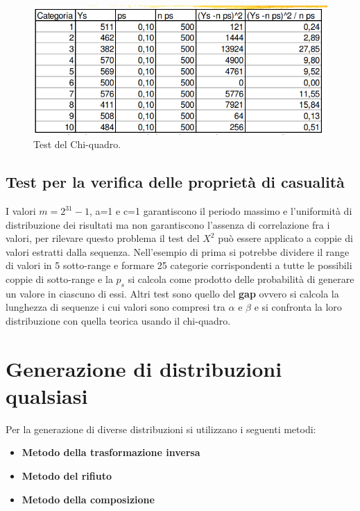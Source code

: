 \begin{figure}[H]
	\centering
    \includegraphics[width=15cm, keepaspectratio]{img/test_chi_quadro.png}
	\caption{Test del Chi-quadro.}\label{fig:chi_quadro}
\end{figure}

\subsection{Test per la verifica delle proprietà di casualità}
I valori $m= 2^31-1$, a=1 e c=1 garantiscono il periodo massimo e l'uniformità di distribuzione dei risultati ma non garantiscono l'assenza di correlazione fra i valori, per rilevare questo problema il test del $X^2$ può essere applicato a coppie di valori estratti dalla sequenza. Nell'esempio di prima si potrebbe dividere il range di valori in 5 sotto-range e formare 25 categorie corrispondenti a tutte le possibili coppie di sotto-range e la $p_s$ si calcola come prodotto delle probabilità di generare un valore in ciascuno di essi. Altri test sono quello del \textbf{gap} ovvero si calcola la lunghezza di sequenze i cui valori sono compresi tra $\alpha$ e $\beta$ e si confronta la loro distribuzione con quella teorica usando il chi-quadro.

\section{Generazione di distribuzioni qualsiasi}
Per la generazione di diverse distribuzioni si utilizzano i seguenti metodi:
\begin{itemize}
    \item\textbf{ Metodo della trasformazione inversa}
    \item \textbf{Metodo del rifiuto}
    \item \textbf{Metodo della composizione}
\end{itemize}

